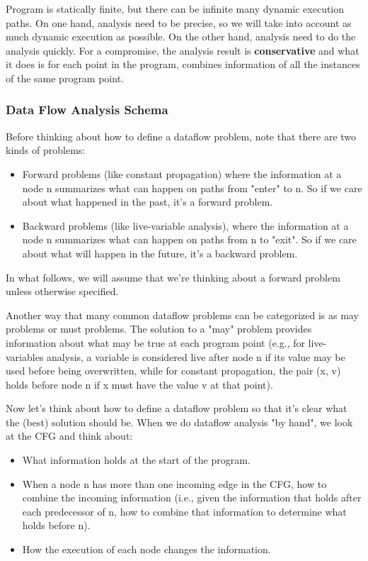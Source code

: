 Program is statically finite, but there can be infinite many dynamic execution paths. On one hand, analysis
 need to be precise, so we will take into account as much dynamic execution as possible. On the other hand, analysis
 need to do the analysis quickly. For a compromise, the analysis result is \textbf{conservative} and what it does is for each 
 point in the program, combines information of all the instances of the same program point.





\subsubsection{Data Flow Analysis Schema}
Before thinking about how to define a dataflow problem, note that there are two kinds of problems:
\begin{itemize}
    \item Forward problems (like constant propagation) where the information at a node n summarizes what can happen on paths from "enter" to n. So if we care about what happened in the past, it's a forward problem.
    \item Backward problems (like live-variable analysis), where the information at a node n summarizes what can happen on paths from n to "exit". So if we care about what will happen in the future, it's a backward problem.
\end{itemize}    

In what follows, we will assume that we're thinking about a forward problem unless otherwise specified.
 
Another way that many common dataflow problems can be categorized is as may problems or must problems. 
The solution to a "may" problem provides information about what may be true at each program point (e.g., 
for live-variables analysis, a variable is considered live after node n if its value may be used before 
being overwritten, while for constant propagation, the pair (x, v) holds before node n if x must have the value v at that point).

Now let's think about how to define a dataflow problem so that it's clear what the (best) solution should be. 
When we do dataflow analysis "by hand", we look at the CFG and think about:

\begin{itemize}
    \item What information holds at the start of the program.
    \item When a node n has more than one incoming edge in the CFG, how to combine the incoming 
    information (i.e., given the information that holds after each predecessor of n, how to 
    combine that information to determine what holds before n).
    \item How the execution of each node changes the information.
\end{itemize}    

